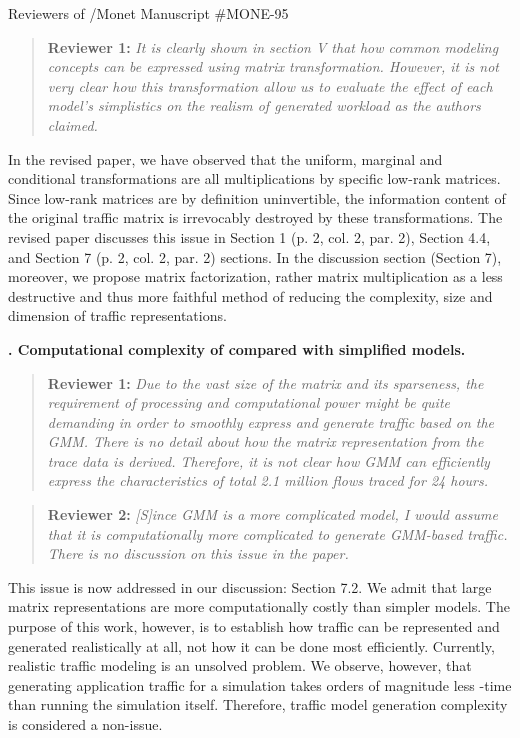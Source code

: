 \documentclass{letter}
\newcounter{topic}
\newcommand{\topic}[1]{
\addtocounter{topic}{1}
\textbf{\arabic{topic}. #1}
}
\newenvironment{reviewer}[1]%
{\begin{quote}\textbf{Reviewer #1:} \it}{\end{quote}}
\begin{document}
\begin{letter}{Reviewers of /Monet Manuscript \#MONE-95}
\begin{reviewer}{1}
It is clearly shown in section V that how common modeling concepts can be expressed using matrix transformation. However, it is not very clear how this transformation allow us to evaluate the effect of each model’s simplistics on the realism of generated workload as the authors claimed.
\end{reviewer}

In the revised paper, we have observed that the uniform, marginal and conditional transformations are all multiplications by specific low-rank matrices.
Since low-rank matrices are by definition uninvertible, the information content of the original traffic matrix is irrevocably destroyed by these transformations.
The revised paper discusses this issue in Section 1 (p. 2, col. 2, par. 2), Section 4.4, and Section 7 (p. 2, col. 2, par. 2) sections.
In the discussion section (Section 7), moreover, we propose matrix factorization, rather matrix multiplication as a less destructive and thus more faithful method of reducing the complexity, size and dimension of traffic representations.

\topic{Computational complexity of  compared with simplified models.}

\begin{reviewer}{1}
Due to the vast size of the matrix and its sparseness, the requirement of processing and computational power might be quite demanding in order to smoothly express and generate traffic based on the GMM. There is no detail about how the matrix representation from the trace data is derived. Therefore, it is not clear how GMM can efficiently express the 
characteristics of total 2.1 million flows traced for 24 hours.
\end{reviewer}

\begin{reviewer}{2}
[S]ince GMM is a more complicated model, I would assume that it is computationally more complicated to generate GMM-based traffic. There is no discussion on this issue in the paper.
\end{reviewer}

This issue is now addressed in our discussion: Section 7.2.
We admit that large matrix representations are more computationally costly than simpler models.
The purpose of this work, however, is to establish how traffic can be represented and generated realistically at all, not how it can be done most efficiently.
Currently, realistic traffic modeling is an unsolved problem.
We observe, however, that generating application traffic for a simulation takes orders of magnitude less -time than running the simulation itself.
Therefore, traffic model generation complexity is considered a non-issue.


\end{letter}
\end{document}
